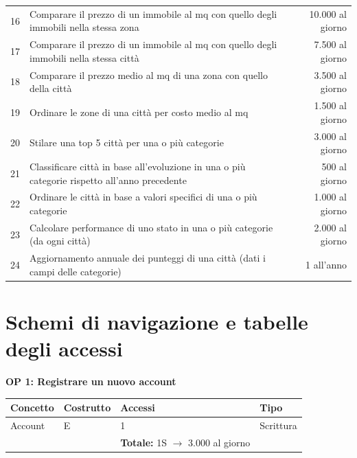 \documentclass[a4paper,12pt]{report}
\begin{document}
\begin{table}[H]
\begin{adjustbox}{width=1.45\textwidth,center}
\begin{tabular}{clr}
             16 & Comparare il prezzo di un immobile al mq con quello degli immobili nella stessa zona & 10.000 al giorno \\
             17 & Comparare il prezzo di un immobile al mq con quello degli immobili nella stessa città & 7.500 al giorno \\
             18 & Comparare il prezzo medio al mq di una zona con quello della città & 3.500 al giorno \\ 
             19 & Ordinare le zone di una città per costo medio al mq & 1.500 al giorno \\
             20 & Stilare una top 5 città per una o più categorie & 3.000 al giorno \\
             21 & Classificare città in base all'evoluzione in una o più categorie rispetto all'anno precedente & 500 al giorno \\ 
             22 & Ordinare le città in base a valori specifici di una o più categorie & 1.000 al giorno \\ 
             23 & Calcolare performance di uno stato in una o più categorie (da ogni città) & 2.000 al giorno \\ 
             24 & Aggiornamento annuale dei punteggi di una città (dati i campi delle categorie) & 1 all'anno \\ [1ex]
            \end{tabular}
            \end{adjustbox}
            \end{table}
        	
    	\section{Schemi di navigazione e tabelle degli accessi}	

        \textbf{OP 1: Registrare un nuovo account}
        	\begin{table}[H]
            \centering
             \begin{tabular}{llll}
             \rowcolor{yellow!20}\textbf{Concetto} & \textbf{Costrutto} & \textbf{Accessi} & \textbf{Tipo} \\ [0.5ex] 
             \hline
             Account & E & 1 & Scrittura \\ 
             \hline
             \rowcolor{yellow!20}\rowcolor{yellow!20} &   & \textbf{Totale:} 1S $\rightarrow$ 3.000 al giorno &  \\ [1ex] 
             \end{tabular}
            \end{table}
\end{document}
